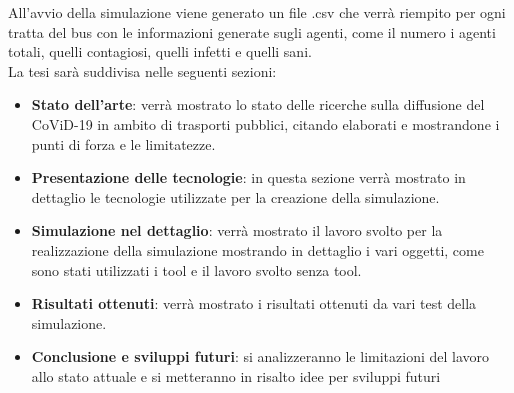 \documentclass[12pt, openany]{book}
\begin{document}
		All'avvio della simulazione viene generato un file .csv che verrà riempito per ogni tratta del bus con le informazioni generate sugli agenti, come il numero i agenti totali, quelli contagiosi, quelli infetti e quelli sani.
		\\
		La tesi sarà suddivisa nelle seguenti sezioni:
		\begin{itemize}
			\item \textbf{Stato dell'arte}: verrà mostrato lo stato delle ricerche sulla diffusione del CoViD-19 in ambito di trasporti pubblici, citando elaborati e mostrandone i punti di forza e le limitatezze.
			\item \textbf{Presentazione delle tecnologie}: in questa sezione verrà mostrato in dettaglio le tecnologie utilizzate per la creazione della simulazione.
			\item\textbf{Simulazione nel dettaglio}: verrà mostrato il lavoro svolto per la realizzazione della simulazione mostrando in dettaglio i vari oggetti, come sono stati utilizzati i tool e il lavoro svolto senza tool.
			\item\textbf{Risultati ottenuti}: verrà mostrato i risultati ottenuti da vari test della simulazione.
			\item\textbf{Conclusione e sviluppi futuri}: si analizzeranno le limitazioni del lavoro allo stato attuale e si metteranno in risalto idee per sviluppi futuri
		\end{itemize}
\end{document}
